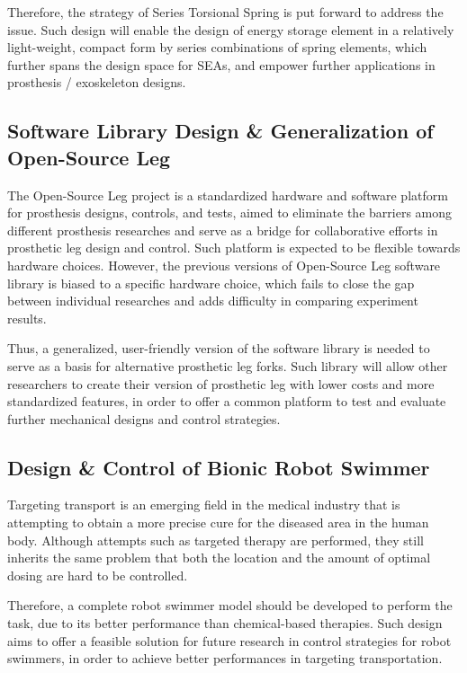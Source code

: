 \documentclass[8pt]{article}
\begin{document}

    Therefore, the strategy of Series Torsional Spring is put forward to address the issue. Such design will enable the design of energy storage element in a relatively light-weight, compact form by series combinations of spring elements, which further spans the design space for SEAs, and empower further applications in prosthesis / exoskeleton designs. 



    \subsection{Software Library Design \& Generalization of Open-Source Leg}   \label{sec:OSL-Library}

    The Open-Source Leg project is a standardized hardware and software platform for prosthesis designs, controls, and tests, aimed to eliminate the barriers among different prosthesis researches and serve as a bridge for collaborative efforts in prosthetic leg design and control. Such platform is expected to be flexible towards hardware choices. However, the previous versions of Open-Source Leg software library is biased to a specific hardware choice, which fails to close the gap between individual researches and adds difficulty in comparing experiment results. 

    Thus, a generalized, user-friendly version of the software library is needed to serve as a basis for alternative prosthetic leg forks. Such library will allow other researchers to create their version of prosthetic leg with lower costs and more standardized features, in order to offer a common platform to test and evaluate further mechanical designs and control strategies.

    \subsection{Design \& Control of Bionic Robot Swimmer}  \label{sec:RobotSwimmer}

    Targeting transport is an emerging field in the medical industry that is attempting to obtain a more precise cure for the diseased area in the human body. Although attempts such as targeted therapy are performed, they still inherits the same problem that both the location and the amount of optimal dosing are hard to be controlled. 

    Therefore, a complete robot swimmer model should be developed to perform the task, due to its better performance than chemical-based therapies. Such design aims to offer a feasible solution for future research in control strategies for robot swimmers, in order to achieve better performances in targeting transportation. 
    
\end{document}
